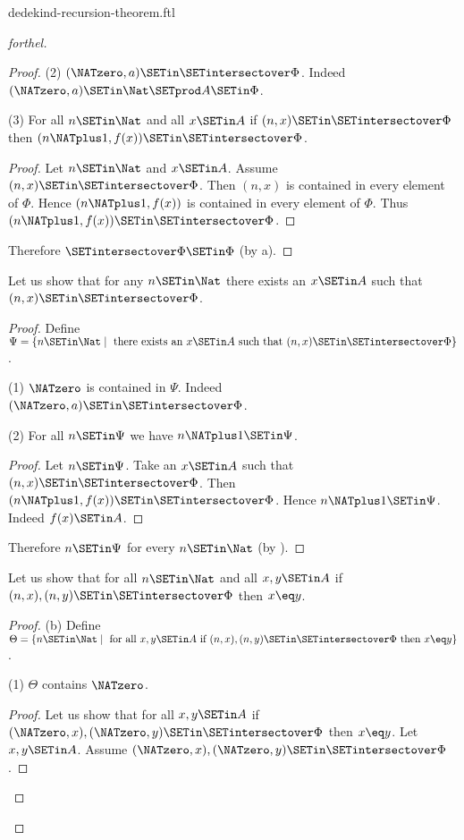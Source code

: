 \documentclass{naproche-library}
\begin{document}
\begin{smodule}[title=Dedekind's Recursion Theorem]{dedekind-recursion-theorem.ftl}
\begin{proof}[forthel]
\begin{proof}
    (2) $(\NATzero, a) \SETin \SETintersectover \Phi$.
    Indeed $(\NATzero, a) \SETin \Nat \SETprod A \SETin \Phi$.

    (3) For all $n \SETin \Nat$ and all $x \SETin A$ if $(n, x) \SETin
    \SETintersectover \Phi$ then $(n \NATplus 1, f(x)) \SETin \SETintersectover \Phi$.
    \begin{proof}
      Let $n \SETin \Nat$ and $x \SETin A$.
      Assume $(n, x) \SETin \SETintersectover \Phi$.
      Then $(n, x)$ is contained in every element of $\Phi$.
      Hence $(n \NATplus 1, f(x))$ is contained in every element of $\Phi$.
      Thus $(n \NATplus 1, f(x)) \SETin \SETintersectover \Phi$.
    \end{proof}

    Therefore $\SETintersectover \Phi \SETin \Phi$ (by a).
  \end{proof}

  Let us show that for any $n \SETin \Nat$ there exists an $x \SETin A$ such
  that $(n, x) \SETin \SETintersectover \Phi$.
  \begin{proof}
    Define $\Psi = \{ n \SETin \Nat \mid \text{ there exists an }x \SETin A\text{ such
    that }(n, x) \SETin \SETintersectover \Phi \}$.

    (1) $\NATzero$ is contained in $\Psi$.
    Indeed $(\NATzero, a) \SETin \SETintersectover \Phi$.

    (2) For all $n \SETin \Psi$ we have $n \NATplus 1 \SETin \Psi$.
    \begin{proof}
      Let $n \SETin \Psi$.
      Take an $x \SETin A$ such that $(n, x) \SETin \SETintersectover \Phi$.
      Then $(n \NATplus 1, f(x)) \SETin \SETintersectover \Phi$.
      Hence $n \NATplus 1 \SETin \Psi$.
      Indeed $f(x) \SETin A$.
    \end{proof}

    Therefore $n \SETin \Psi$ for every $n \SETin \Nat$ (by ).
  \end{proof}

  Let us show that for all $n \SETin \Nat$ and all $x, y \SETin A$ if
  $(n, x), (n, y) \SETin \SETintersectover \Phi$ then $x \eq y$.
  \begin{proof}
    (b) Define $\Theta = \{ n \SETin \Nat \mid \text{ for all }x, y \SETin A\text{ if }
    (n, x), (n, y) \SETin \SETintersectover \Phi\text{ then }x \eq y \}$.

    (1) $\Theta$ contains $\NATzero$.
    \begin{proof}
      Let us show that for all $x, y \SETin A$ if $(\NATzero, x), (\NATzero, y) \SETin
      \SETintersectover \Phi$ then $x \eq y$.
        Let $x, y \SETin A$.
        Assume $(\NATzero, x), (\NATzero, y) \SETin \SETintersectover \Phi$.


\end{proof}
\end{proof}
\end{proof}
\end{smodule}
\end{document}
